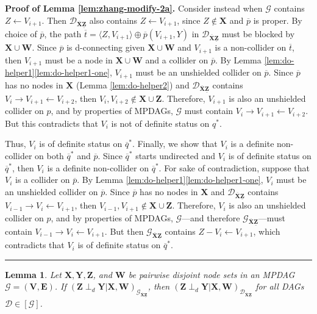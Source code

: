 \documentclass[11pt]{article}
\newcommand{\BlackBox}{\rule{1.5ex}{1.5ex}}  %
\newtheorem{lemma}[theorem]{Lemma}
\newcommand{\mb}[1]{\mathbf{#1}}
\newcommand{\dsepp}{\perp_{d}}
\newcommand{\g}[1][G]{\mathcal{#1}}
\newenvironment{proofof}[1][]{\noindent \textbf{Proof of #1.}}{\hfill\BlackBox}
\begin{document}
\begin{proofof}[Lemma \ref{lem:zhang-modify-2a}]
    Consider instead when $\g$ contains $Z \gets V_{i+1}$. Then $\g[D]_{\overline{\mb{X}}\underline{\mb{Z}}}$ also contains $Z \gets V_{i+1}$, since $Z \notin \mb{X}$ and $\overline{p}$ is proper. By choice of $\overline{p}$, the path $\overline{t} = \langle Z, V_{i+1} \rangle \oplus \overline{p}(V_{i+1}, Y)$ in $\g[D]_{\overline{\mb{X}}\underline{\mb{Z}}}$ must be blocked by $\mb{X} \cup \mb{W}$. Since $\overline{p}$ is d-connecting given $\mb{X} \cup \mb{W}$ and $V_{i+1}$ is a non-collider on $\overline{t}$, then $V_{i+1}$ must be a node in $\mb{X} \cup \mb{W}$ and a collider on $\overline{p}$. By Lemma \ref{lem:do-helper1}\ref{lem:do-helper1-one}, $V_{i+1}$ must be an unshielded collider on $\overline{p}$. Since $\overline{p}$ has no nodes in $\mb{X}$ (Lemma \ref{lem:do-helper2}) and $\g[D]_{\overline{\mb{X}}\underline{\mb{Z}}}$ contains $V_i \to V_{i+1} \gets V_{i+2}$, then $V_i, V_{i+2} \notin \mb{X} \cup \mb{Z}$. Therefore, $V_{i+1}$ is also an unshielded collider on $p$, and by properties of MPDAGs, $\g$ must contain $V_i \to V_{i+1} \gets V_{i+2}$. But this contradicts that $V_i$ is not of definite status on $q^*$.

    Thus, $V_i$ is of definite status on $\overline{q}^*$. Finally, we show that $V_i$ is a definite non-collider on both $\overline{q}^*$ and $\overline{p}$. Since $\overline{q}^*$ starts undirected and $V_i$ is of definite status on $\overline{q}^*$, then $V_i$ is a definite non-collider on $\overline{q}^*$. For sake of contradiction, suppose that $V_i$ is a collider on $\overline{p}$. By Lemma \ref{lem:do-helper1}\ref{lem:do-helper1-one}, $V_i$ must be an unshielded collider on $\overline{p}$. Since $\overline{p}$ has no nodes in $\mb{X}$ and $\g[D]_{\overline{\mb{X}}\underline{\mb{Z}}}$ contains $V_{i-1} \to V_i \gets V_{i+1}$, then $V_{i-1}, V_{i+1} \notin \mb{X} \cup \mb{Z}$. Therefore, $V_i$ is also an unshielded collider on $p$, and by properties of MPDAGs, $\g$---and therefore $\g_{\overline{\mb{X}}\underline{\mb{Z}}}$---must contain $V_{i-1} \to V_i \gets V_{i+1}$. But then $\g_{\overline{\mb{X}}\underline{\mb{Z}}}$ contains $Z - V_i \gets V_{i+1}$, which contradicts that $V_i$ is of definite status on $\overline{q}^*$.
\end{proofof}



\begin{lemma}
\label{lem:zhang-modify-2b}
    Let $\mb{X,Y,Z}$, and $\mb{W}$ be pairwise disjoint node sets in an MPDAG $\g = (\mb{V,E})$. If $(\mb{Z} \dsepp \mb{Y} |\mb{X}, \mb{W})_{\g_{\overline{\mb{X}}\underline{\mb{Z}}}}$, then $(\mb{Z} \dsepp \mb{Y} |\mb{X}, \mb{W})_{\g[D]_{\overline{\mb{X}}\underline{\mb{Z}}}}$ for all DAGs $\g[D] \in [\g]$.
\end{lemma}
\end{document}
